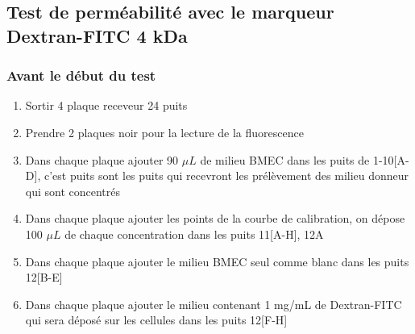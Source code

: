 \subsection{Test de perméabilité avec le marqueur Dextran-FITC 4 kDa}

\subsubsection{Avant le début du test}

\begin{enumerate}
\item Sortir 4 plaque receveur 24 puits 
\item Prendre 2 plaques noir pour la lecture de la fluorescence
\item Dans chaque plaque ajouter 90 $\mu L$ de milieu BMEC dans les puits de 1-10[A-D], c'est puits sont les puits qui recevront les prélèvement des milieu donneur qui sont concentrés
\item Dans chaque plaque ajouter les points de la courbe de calibration, on dépose 100 $\mu L$ de chaque concentration dans les puits 11[A-H], 12A
\item Dans chaque plaque ajouter le milieu BMEC seul comme blanc dans les puits 12[B-E]
\item Dans chaque plaque ajouter le milieu contenant 1 mg/mL de Dextran-FITC qui sera déposé sur les cellules dans les puits 12[F-H]  
\end{enumerate}


